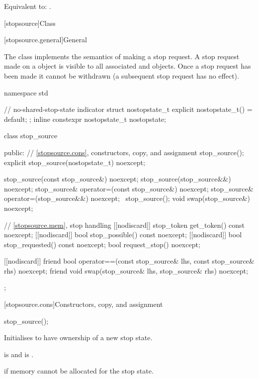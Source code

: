 \begin{itemdescr}
\pnum
\effects
Equivalent to: .
\end{itemdescr}

[stopsource]{Class }%
%

[stopsource.general]{General}

\pnum
{}%
The class  implements the semantics of making a stop request.
A stop request made on a  object is visible to all
associated  and  objects.
Once a stop request has been made it cannot be withdrawn
(a subsequent stop request has no effect).

%
%

\begin{codeblock}
namespace std {
  // no-shared-stop-state indicator
  struct nostopstate_t {
    explicit nostopstate_t() = default;
  };
  inline constexpr nostopstate_t nostopstate{};

  class stop_source {
  public:
    // \ref{stopsource.cons}, constructors, copy, and assignment
    stop_source();
    explicit stop_source(nostopstate_t) noexcept;

    stop_source(const stop_source&) noexcept;
    stop_source(stop_source&&) noexcept;
    stop_source& operator=(const stop_source&) noexcept;
    stop_source& operator=(stop_source&&) noexcept;
    ~stop_source();
    void swap(stop_source&) noexcept;

    // \ref{stopsource.mem}, stop handling
    [[nodiscard]] stop_token get_token() const noexcept;
    [[nodiscard]] bool stop_possible() const noexcept;
    [[nodiscard]] bool stop_requested() const noexcept;
    bool request_stop() noexcept;

    [[nodiscard]] friend bool
      operator==(const stop_source& lhs, const stop_source& rhs) noexcept;
    friend void swap(stop_source& lhs, stop_source& rhs) noexcept;
  };
}
\end{codeblock}

[stopsource.cons]{Constructors, copy, and assignment}

%
\begin{itemdecl}
stop_source();
\end{itemdecl}

\begin{itemdescr}
\pnum
\effects
Initialises  to have ownership of a new stop state.

\pnum
\ensures
{} is 
and  is .

\pnum
\throws
{} if memory cannot be allocated for the stop state.
\end{itemdescr}

